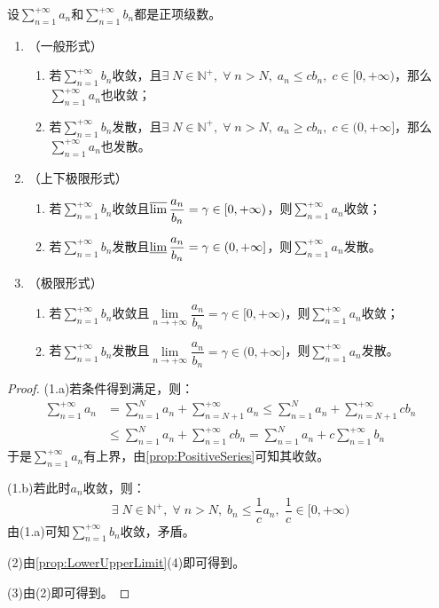 \begin{theorem}\label{theo:ComparisonTest}
	设$\sum\limits_{n=1}^{+\infty}a_n$和$\sum\limits_{n=1}^{+\infty}b_n$都是正项级数。
	\begin{enumerate}
		\item （一般形式）
		\begin{enumerate}
			\item 若$\sum\limits_{n=1}^{+\infty}b_n$收敛，且$\exists\;N\in\mathbb{N}^+,\;\forall\;n>N,\;a_n\leqslant cb_n,\;c\in[0,+\infty)$，那么$\sum\limits_{n=1}^{+\infty}a_n$也收敛；
			\item 若$\sum\limits_{n=1}^{+\infty}b_n$发散，且$\exists\;N\in\mathbb{N}^+,\;\forall\;n>N,\;a_n\geqslant cb_n,\;c\in(0,+\infty]$，那么$\sum\limits_{n=1}^{+\infty}a_n$也发散。
		\end{enumerate}
		\item （上下极限形式）
		\begin{enumerate}
			\item 若$\sum\limits_{n=1}^{+\infty}b_n$收敛且$\varlimsup\dfrac{a_n}{b_n}=\gamma\in[0,+\infty)$，则$\sum\limits_{n=1}^{+\infty}a_n$收敛；
			\item 若$\sum\limits_{n=1}^{+\infty}b_n$发散且$\varliminf\dfrac{a_n}{b_n}=\gamma\in(0,+\infty]$，则$\sum\limits_{n=1}^{+\infty}a_n$发散。
		\end{enumerate}
		\item （极限形式）
		\begin{enumerate}
			\item 若$\sum\limits_{n=1}^{+\infty}b_n$收敛且$\lim\limits_{n\to+\infty}\dfrac{a_n}{b_n}=\gamma\in[0,+\infty)$，则$\sum\limits_{n=1}^{+\infty}a_n$收敛；
			\item 若$\sum\limits_{n=1}^{+\infty}b_n$发散且$\lim\limits_{n\to+\infty}\dfrac{a_n}{b_n}=\gamma\in(0,+\infty]$，则$\sum\limits_{n=1}^{+\infty}a_n$发散。
		\end{enumerate}
	\end{enumerate}
\end{theorem}
\begin{proof}
	(1.a)若条件得到满足，则：
	\begin{align*}
		\sum_{n=1}^{+\infty}a_n&=\sum_{n=1}^Na_n+\sum_{n=N+1}^{+\infty}a_n\leqslant\sum_{n=1}^Na_n+\sum_{n=N+1}^{+\infty}cb_n \\
		&\leqslant\sum_{n=1}^Na_n+\sum_{n=1}^{+\infty}cb_n =\sum_{n=1}^Na_n+c\sum_{n=1}^{+\infty}b_n
	\end{align*}
	于是$\sum\limits_{n=1}^{+\infty}a_n$有上界，由\cref{prop:PositiveSeries}可知其收敛。\par
	(1.b)若此时$a_n$收敛，则：
	\begin{equation*}
		\exists\;N\in\mathbb{N}^+,\;\forall\;n>N,\;b_n\leqslant\frac{1}{c}a_n,\;\frac{1}{c}\in[0,+\infty)
	\end{equation*}
	由(1.a)可知$\sum\limits_{n=1}^{+\infty}b_n$收敛，矛盾。\par
	(2)由\cref{prop:LowerUpperLimit}(4)即可得到。\par
	(3)由(2)即可得到。
\end{proof}
